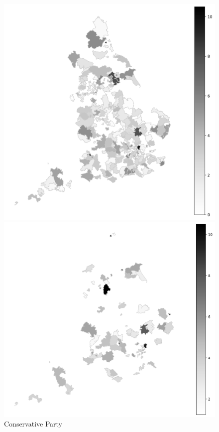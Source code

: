 \documentclass[12pt,letterpaper]{article}
\begin{document}
\begin{figure}[H] %
	\centering
	
	\begin{minipage}[t]{0.335\textwidth}
		\centering
		\includegraphics[width=\textwidth,height=0.68\textheight,keepaspectratio]{plots/ConservativeParty_2010GeneralElection_Environmental_Mentions.png}
		\caption{Conservative Party}
	\end{minipage}\hfill
	\begin{minipage}[t]{0.335\textwidth}
		\centering
		\includegraphics[width=\textwidth,height=0.68\textheight,keepaspectratio]{plots/GreenParty_2010GeneralElection_Environmental_Mentions.png}

\end{minipage}
\end{figure}
\end{document}
